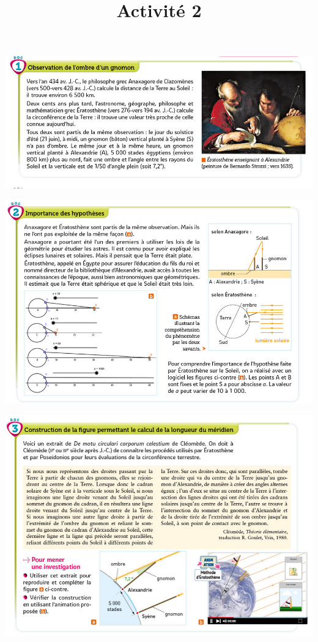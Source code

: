 \documentclass[10pt]{article}
\newcommand{\titreActivite}{Activité 2} %
\newcommand{\myscale}{0.46}
\begin{document}
\date{}
\title{\titreActivite}
\maketitle %


\begin{center}
 	\includegraphics[scale=\myscale]{assets/d1.png}

 	\includegraphics[scale=\myscale]{assets/d2.png}

    \includegraphics[scale=\myscale]{assets/d3.png}


\end{center}
\end{document}
